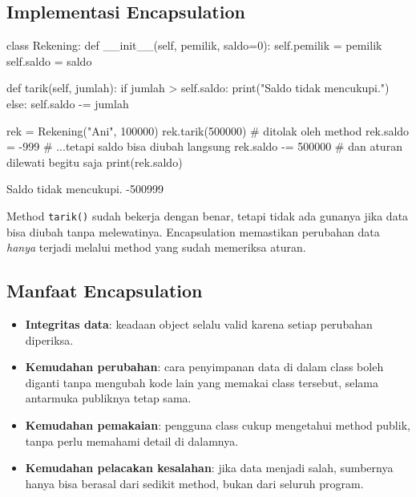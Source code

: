 \subsection{Implementasi Encapsulation}

\begin{kode}
class Rekening:
    def __init__(self, pemilik, saldo=0):
        self.pemilik = pemilik
        self.saldo = saldo

    def tarik(self, jumlah):
        if jumlah > self.saldo:
            print("Saldo tidak mencukupi.")
        else:
            self.saldo -= jumlah

rek = Rekening("Ani", 100000)
rek.tarik(500000)      # ditolak oleh method
rek.saldo = -999       # ...tetapi saldo bisa diubah langsung
rek.saldo -= 500000    # dan aturan dilewati begitu saja
print(rek.saldo)
\end{kode}

\begin{keluaran}
Saldo tidak mencukupi.
-500999
\end{keluaran}

Method \texttt{tarik()} sudah bekerja dengan benar, tetapi tidak ada gunanya jika data bisa diubah tanpa melewatinya. Encapsulation memastikan perubahan data \emph{hanya} terjadi melalui method yang sudah memeriksa aturan.

\subsection{Manfaat Encapsulation}

\begin{itemize}
  \item \textbf{Integritas data}: keadaan object selalu valid karena setiap perubahan diperiksa.
  \item \textbf{Kemudahan perubahan}: cara penyimpanan data di dalam class boleh diganti tanpa mengubah kode lain yang memakai class tersebut, selama antarmuka publiknya tetap sama.
  \item \textbf{Kemudahan pemakaian}: pengguna class cukup mengetahui method publik, tanpa perlu memahami detail di dalamnya.
  \item \textbf{Kemudahan pelacakan kesalahan}: jika data menjadi salah, sumbernya hanya bisa berasal dari sedikit method, bukan dari seluruh program.
\end{itemize}

